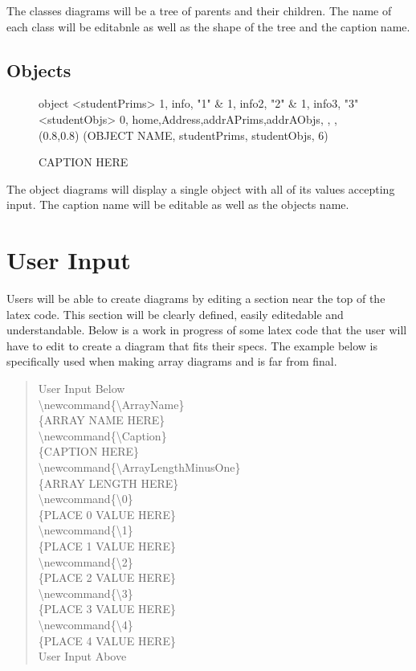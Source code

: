 \documentclass[10pt,a4paper,english]{article}
\begin{document}
The classes diagrams will be a tree of parents and their children.  The name of each class will be editabnle as well as the shape of the tree and the caption name.
\newpage
\subsection*{Objects}

\begin {figure}[!htbp]
\Draw
 {object}
\Indirect \Table <studentPrims>
{  1, info, "1" 		&
   1, info2,  "2"		&
   1, info3,  "3"		
}
\Indirect \Table <studentObjs>
 {  0, home,Address,addrAPrims,addrAObjs, , , }
  \Scale (0.8,0.8)
\OD (OBJECT NAME, studentPrims, studentObjs, 6)
    \EndDraw
\caption {CAPTION HERE}
\label {fig:simpleStudent}
\end {figure}

The object diagrams will display a single object with all of its values accepting input.  The caption name will be editable as well as the objects name.

\section{User Input}
Users will be able to create diagrams by editing a section near the top of the latex code.  This section will be clearly defined, easily editedable and understandable.  Below is a work in progress of some latex code that the user will have to edit to create a diagram that fits their specs. The example below is specifically used when making array diagrams and is far from final.

\begin{quote}{\ttfamily \raggedright \noindent
User Input Below~\\
{\textbackslash}newcommand{\{}{\textbackslash}ArrayName{\}}~\\
{\{}ARRAY NAME HERE{\}}~\\
{\textbackslash}newcommand{\{}{\textbackslash}Caption{\}}~\\
{\{}CAPTION HERE{\}}~\\
{\textbackslash}newcommand{\{}{\textbackslash}ArrayLengthMinusOne{\}}~\\
{\{}ARRAY LENGTH HERE{\}}~\\
{\textbackslash}newcommand{\{}{\textbackslash}0{\}}~\\
{\{}PLACE 0 VALUE HERE{\}}~\\
{\textbackslash}newcommand{\{}{\textbackslash}1{\}}~\\
{\{}PLACE 1 VALUE HERE{\}}~\\
{\textbackslash}newcommand{\{}{\textbackslash}2{\}}~\\
{\{}PLACE 2 VALUE HERE{\}}~\\
{\textbackslash}newcommand{\{}{\textbackslash}3{\}}~\\
{\{}PLACE 3 VALUE HERE{\}}~\\
{\textbackslash}newcommand{\{}{\textbackslash}4{\}}~\\
{\{}PLACE 4 VALUE HERE{\}}~\\
User Input Above~\\
}\end{quote}
\end{document}
